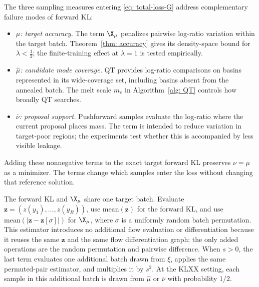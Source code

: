 \documentclass{article}
\begin{document}
The three sampling measures entering \eqref{eq: total-loss-G} address complementary failure modes of forward KL:
\begin{itemize}
    \item \emph{$\mu$: target accuracy.} The term $\X_\mu$ penalizes pairwise log-ratio variation within the target batch. Theorem~\ref{thm: accuracy} gives its density-space bound for $\lambda<\frac12$; the finite-training effect at $\lambda=1$ is tested empirically.
    \item \emph{$\hat\mu$: candidate mode coverage.} QT provides log-ratio comparisons on basins represented in its wide-coverage set, including basins absent from the annealed batch. The melt scale $m_e$ in Algorithm~\ref{alg: QT} controls how broadly QT searches.
    \item \emph{$\bar\nu$: proposal support.} Pushforward samples evaluate the log-ratio where the current proposal places mass. The term is intended to reduce variation in target-poor regions; the experiments test whether this is accompanied by less visible leakage.
\end{itemize}
Adding these nonnegative terms to the exact target forward KL preserves $\nu=\mu$ as a minimizer. The terms change which samples enter the loss without changing that reference solution.

The forward KL and $\X_\mu$ share one target batch. Evaluate $\mathbf z = (z(y_1),\dots,z(y_B))$, use $\mathrm{mean}(\mathbf z)$ for the forward KL, and use $\mathrm{mean}(|\mathbf z - \mathbf z[\sigma]|)$ for $\X_\mu$, where $\sigma$ is a uniformly random batch permutation. This estimator introduces no additional flow evaluation or differentiation because it reuses the same $\mathbf z$ and the same flow differentiation graph; the only added operations are the random permutation and pairwise difference. When $s>0$, the last term evaluates one additional batch drawn from $\xi$, applies the same permuted-pair estimator, and multiplies it by $s^2$. At the KLXX setting, each sample in this additional batch is drawn from $\hat\mu$ or $\bar\nu$ with probability $1/2$.
\end{document}
